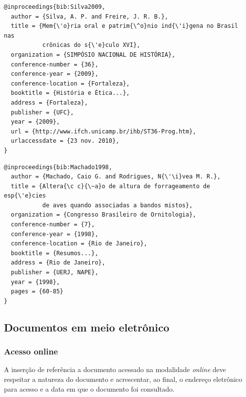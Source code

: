 \documentclass[a4paper,12pt,oneside,onecolumn,final,fleqn]{repUERJ}
\begin{document}
\noindent{}

\begin{verbatim}
@inproceedings{bib:Silva2009,
  author = {Silva, A. P. and Freire, J. R. B.},
  title = {Mem{\'o}ria oral e patrim{\^o}nio ind{\'i}gena no Brasil nas
           crônicas do s{\'e}culo XVI},
  organization = {SIMPÓSIO NACIONAL DE HISTÓRIA},
  conference-number = {36},
  conference-year = {2009},
  conference-location = {Fortaleza},
  booktitle = {História e Ética...},
  address = {Fortaleza},
  publisher = {UFC},
  year = {2009},
  url = {http://www.ifch.unicamp.br/ihb/ST36-Prog.htm},
  urlaccessdate = {23 nov. 2010},
}
\end{verbatim}

\noindent{}

\begin{verbatim}
@inproceedings{bib:Machado1998,
  author = {Machado, Caio G. and Rodrigues, N{\'\i}vea M. R.},
  title = {Altera{\c c}{\~a}o de altura de forrageamento de esp{\'e}cies 
           de aves quando associadas a bandos mistos},
  organization = {Congresso Brasileiro de Ornitologia},
  conference-number = {7},
  conference-year = {1998},
  conference-location = {Rio de Janeiro},
  booktitle = {Resumos...},
  address = {Rio de Janeiro},
  publisher = {UERJ, NAPE},
  year = {1998},
  pages = {60-85}
}
\end{verbatim}

\subsection{Documentos em meio eletrônico}

\subsubsection{Acesso online}

A inserção de referência a documento acessado na modalidade \textsl{online} deve respeitar a natureza do documento e acrescentar, ao final, o endereço eletrônico para acesso e a data em que o documento foi consultado.\\

\noindent{}
\end{document}
